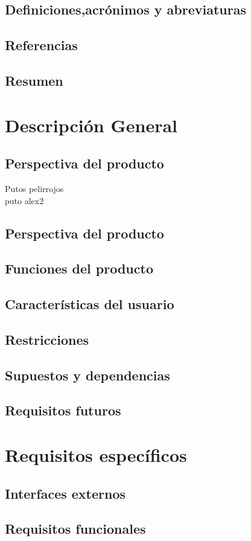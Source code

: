 \documentclass{article}
\begin{document}
\subsection{Definiciones,acrónimos y abreviaturas}
\subsection{Referencias}
\subsection{Resumen}
\section{Descripción General }
\subsection{Perspectiva del producto}
Putos pelirrojos\\
puto alex2
\subsection{Perspectiva del producto}
\subsection{Funciones del producto}
\subsection{Características del usuario}
\subsection{Restricciones}
\subsection{Supuestos y dependencias}
\subsection{Requisitos futuros}
\section{Requisitos específicos}
\subsection{Interfaces externos}
\subsection{Requisitos funcionales}
\end{document}
